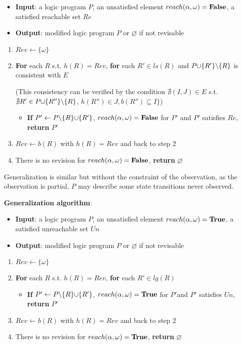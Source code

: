     \begin{itemize}
        \item \textbf{Input}: a logic program $P$, an unsatisfied element $reach(\alpha,\omega)=\mathbf{False}$, a satisfied reachable set $Re$%
        \item \textbf{Output}: modified logic program $P$ or $\varnothing$ if not revisable
    \end{itemize}
    \begin{enumerate}
        \item $Rev\gets\{\omega\}$
        \item \textbf{For} each $R$ s.t. $h(R)=Rev$, \textbf{for} each $R'\in ls(R)$ and $P\addset{R'}\miset{R}$ is consistent with $E$
        
        (This consistency can be verified by the condition $\nexists (I,J)\in E$ s.t. $\nexists R'\in P\addset{R''}\miset{R}$, $h(R'')\in J, b(R'')\subseteq I\}$)
        \begin{itemize}
            \item \textbf{If} $P' \gets P \miset{R} \addset{R'}$, $reach(\alpha,\omega)=\mathbf{False}$ for $P'$ and $P'$ satisfies $Re$, \textbf{return} $P'$
        \end{itemize}
        \item $Rev\gets b(R)$ with $h(R)=Rev$ and back to step 2
        \item There is no revision for $reach(\alpha,\omega)=\mathbf{False}$, \textbf{return} $\varnothing$
    \end{enumerate}
    
     Generalization is similar but without the constraint of the observation, as the observation is partial, $P$ may describe some state transitions never observed.
     
    \textbf{Generalization algorithm}:
    
    \begin{itemize}
        \item \textbf{Input}: a logic program $P$, an unsatisfied element $reach(\alpha,\omega)=\mathbf{True}$, a satisfied unreachable set $Un$
        \item \textbf{Output}: modified logic program $P$ or $\varnothing$ if not revisable
    \end{itemize}
    \begin{enumerate}
        \item $Rev\gets\{\omega\}$
        \item \textbf{For} each $R$ s.t. $h(R)=Rev$, \textbf{for} each $R'\in lg(R)$
        \begin{itemize}
            \item \textbf{If} $P' \gets P \miset{R} \addset{R'}$, $reach(\alpha,\omega)=\mathbf{True}$ for $P'$and $P'$ satisfies $Un$, \textbf{return} $P'$
        \end{itemize}
        \item $Rev\gets b(R)$ with $h(R)=Rev$ and back to step 2
        \item There is no revision for $reach(\alpha,\omega)=\mathbf{True}$, \textbf{return} $\varnothing$
    \end{enumerate}
    
